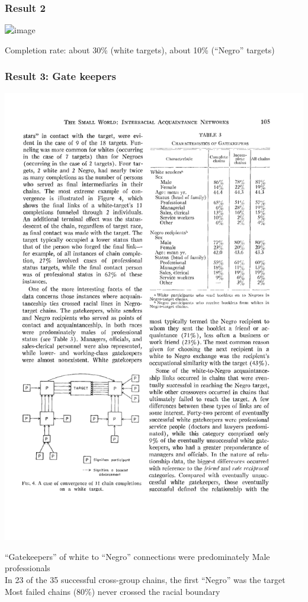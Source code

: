 \documentclass[aspectratio=169]{beamer}
\begin{document}
\begin{frame}
\frametitle{Result 2}

\begin{center}
\includegraphics<1>[width=0.8\textwidth]{figures/korte_aquaintance_1970_tab2}
\end{center}

\vfill
Completion rate: about 30\% (white targets), about 10\% (``Negro'' targets)


\end{frame}
\begin{frame}
\frametitle{Result 3: Gate keepers}

\begin{center}
\includegraphics[height=0.6\textheight]{figures/korte_aquaintance_1970_tab3}
\end{center}

\vfill
``Gatekeepers'' of white to ``Negro'' connections were predominately Male professionals\\
In 23 of the 35 successful cross-group chains, the first ``Negro'' was the target\\
Most failed chains (80\%) never crossed the racial boundary\\

\end{frame}
\end{document}
